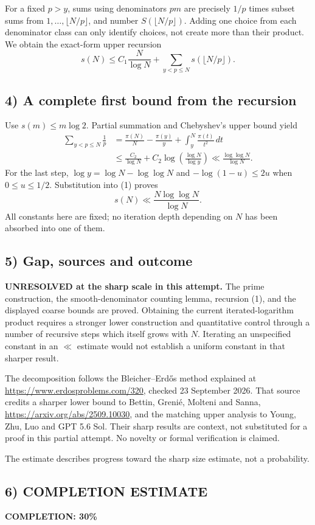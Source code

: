 For a fixed $p>y$, sums using denominators $pm$ are precisely $1/p$ times subset sums from $1,\ldots,\lfloor N/p\rfloor$, and number $S(\lfloor N/p\rfloor)$. Adding one choice from each denominator class can only identify choices, not create more than their product. We obtain the exact-form upper recursion
\[s(N)\le C_1\frac N{\log N}+\sum_{y<p\le N}s(\lfloor N/p\rfloor).\tag{1}\]

\subsection*{4) A complete first bound from the recursion}
Use $s(m)\le m\log2$. Partial summation and Chebyshev's upper bound yield
\begin{align*}
\sum_{y<p\le N}\frac1p
&=\frac{\pi(N)}N-\frac{\pi(y)}y+\int_y^N\frac{\pi(t)}{t^2}\,dt\\
&\le\frac{C_2}{\log N}+C_2\log\!\left(\frac{\log N}{\log y}\right)
\ll\frac{\log\log N}{\log N}.
\end{align*}
For the last step, $\log y=\log N-\log\log N$ and $-\log(1-u)\le2u$ when $0\le u\le1/2$. Substitution into (1) proves
\[s(N)\ll\frac{N\log\log N}{\log N}.
\]
All constants here are fixed; no iteration depth depending on $N$ has been absorbed into one of them.

\subsection*{5) Gap, sources and outcome}
\textbf{UNRESOLVED at the sharp scale in this attempt.} The prime construction, the smooth-denominator counting lemma, recursion (1), and the displayed coarse bounds are proved. Obtaining the current iterated-logarithm product requires a stronger lower construction and quantitative control through a number of recursive steps which itself grows with $N$. Iterating an unspecified constant in an $\ll$ estimate would not establish a uniform constant in that sharper result.

The decomposition follows the Bleicher--Erd\H{o}s method explained at \url{https://www.erdosproblems.com/320}, checked 23 September 2026. That source credits a sharper lower bound to Bettin, Greni\'e, Molteni and Sanna, \url{https://arxiv.org/abs/2509.10030}, and the matching upper analysis to Young, Zhu, Luo and GPT 5.6 Sol. Their sharp results are context, not substituted for a proof in this partial attempt. No novelty or formal verification is claimed.

The estimate describes progress toward the sharp size estimate, not a probability.
\subsection*{6) COMPLETION ESTIMATE}
\textbf{COMPLETION: 30\%}
